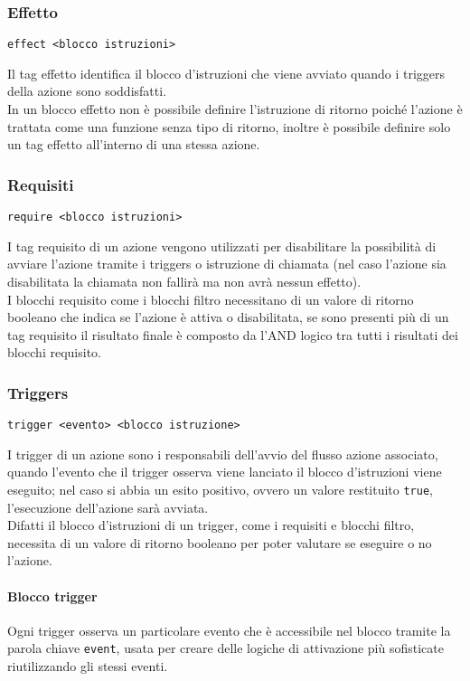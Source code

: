 \subsubsection{Effetto}
\begin{lstlisting}
effect <blocco istruzioni>
\end{lstlisting} 
Il tag effetto identifica il blocco d'istruzioni che viene avviato quando i triggers della azione sono 
soddisfatti. \\
In un blocco effetto non è possibile definire l'istruzione di ritorno poiché l'azione è trattata come 
una funzione senza tipo di ritorno, inoltre è possibile definire solo un tag effetto all'interno 
di una stessa azione.

\subsubsection{Requisiti}
\begin{lstlisting}
require <blocco istruzioni> 
\end{lstlisting}
I tag requisito di un azione vengono utilizzati per disabilitare la possibilità di avviare 
l'azione tramite i triggers o istruzione di chiamata (nel caso l'azione sia 
disabilitata la chiamata non fallirà ma non avrà nessun effetto). \\
I blocchi requisito come i blocchi filtro necessitano di un valore di ritorno booleano che indica 
se l'azione è attiva o disabilitata, se sono presenti più di un tag requisito il risultato finale
è composto da l'AND logico tra tutti i risultati dei blocchi requisito.

\subsubsection{Triggers}
\begin{lstlisting}
trigger <evento> <blocco istruzione>
\end{lstlisting}
I trigger di un azione sono i responsabili dell'avvio del flusso azione associato, 
quando l'evento che il trigger osserva viene lanciato il blocco d'istruzioni viene eseguito; 
nel caso si abbia un esito positivo, ovvero un valore restituito \lstinline|true|, 
l'esecuzione dell'azione sarà avviata. \\
Difatti il blocco d'istruzioni di un trigger, come i requisiti e blocchi filtro, necessita di un 
valore di ritorno booleano per poter valutare se eseguire o no l'azione.

\paragraph{Blocco trigger}
Ogni trigger osserva un particolare evento che è accessibile nel blocco tramite la parola chiave 
\lstinline|event|, usata per creare delle logiche di attivazione più sofisticate riutilizzando gli stessi eventi. \\


